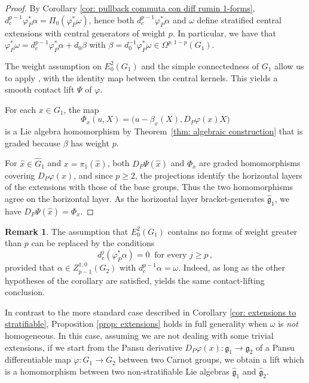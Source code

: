\documentclass[dvipsnames]{amsart}
\theoremstyle{definition}
\newtheorem{remark}[theorem]{Remark}
\theoremstyle{definition}
\numberwithin{equation}{section}
\begin{document}
\begin{proof}
By Corollary \ref{cor: pullback commuta con diff rumin 1-forms}, $d_c^{p-1}\varphi_P^\ast\alpha=\Pi_0(\varphi_P^*\omega)$, hence both $d_c^{p-1}\varphi_P^\ast\alpha$ and $\omega$ define stratified central extensions
with central generators of weight $p$. In particular, we have that $\varphi_P^\ast\omega=d_c^{p-1}\varphi_P^\ast\alpha+d_0\beta$ with $\beta=d_0^{-1}\varphi_P^\ast\omega\in\Omega^{p,1-p}(G_1)$.

The weight assumption on $E_0^2(G_1)$ and the simple connectedness
of $G_1$ allow us to apply
\cite[Theorem 1.4]{hakavuori2025smoothcontactliftscentral},
with the identity map between the central kernels.
This yields a smooth contact lift $\Psi$ of $\varphi$.

For each $x\in G_1$, the map
\[
    \Phi_x(u,X)
    =
    \bigl(u-\beta_x(X),D_P\varphi(x)X\bigr)
\]
is a Lie algebra homomorphism by
Theorem~\ref{thm: algebraic construction} that is graded because $\beta$ has weight $p$.

For $\hat x\in\hat G_1$ and $x=\pi_1(\hat x)$,
both $D_P\Psi(\hat x)$ and $\Phi_x$ are graded
homomorphisms covering $D_P\varphi(x)$, and since $p\geq2$,
the projections identify the horizontal layers
of the extensions with those of the base groups.
Thus the two homomorphisms agree on the horizontal
layer. As the horizontal layer bracket-generates $\hat{\mathfrak g}_1$,
we have $D_P\Psi(\hat x)=\Phi_x$.
\end{proof}

\begin{remark}
The assumption that $E_0^2(G_1)$ contains no forms of weight
greater than $p$ can be replaced by the conditions
$$d_c^j(\varphi_P^*\alpha)=0
    \ \text{ for every }j\geq p\,,$$
provided that $\alpha\in Z_{p-1}^{1,0}(G_2)$ with $d_c^{p-1}\alpha=\omega$. Indeed, as long as the other hypotheses of the corollary are satisfied, \cite[Theorem 1.1]{hakavuori2025smoothcontactliftscentral}
yields the same contact-lifting conclusion.
\end{remark}


In contrast to the more standard case described in Corollary \ref{cor: extensions to stratifiable}, Proposition \ref{prop: extensions} holds in full generality when $\omega$ is \textit{not} homogeneous. In this case, assuming we are not dealing with some trivial extensions, if we start from the Pansu derivative $D_P\varphi(x)\colon\mathfrak{g}_1\to\mathfrak{g}_2$ of a Pansu differentiable map $\varphi\colon G_1\to G_2$ between two Carnot groups, we obtain a lift which is a homomorphism between two non-stratifiable Lie algebras $\hat{\mathfrak{g}}_1$ and $\hat{\mathfrak{g}}_2$. 
\end{document}
